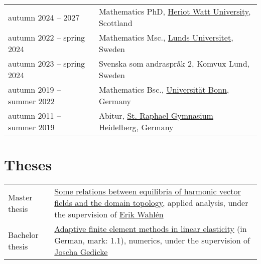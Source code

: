 \documentclass[11pt, letterpaper]{article}
\begin{document}
\begin{tabularx}{\textwidth}{>{\raggedright\arraybackslash}p{45mm} >{\raggedright\arraybackslash}X}
autumn 2024\linebreak\hspace*{1em} -- 2027 & Mathematics PhD, \href{https://www.maxwell.ac.uk/}{Heriot Watt University}, Scottland \\[0.5ex]
  autumn 2022\linebreak\hspace*{1em} -- spring 2024 & Mathematics Msc., \href{https://maths.lu.se/}{Lunds Universitet}, Sweden \\[0.5ex]
  autumn 2023\linebreak\hspace*{1em} -- spring 2024 & Svenska som andraspråk 2, Komvux Lund, Sweden \\[0.5ex]
  autumn 2019\linebreak\hspace*{1em} -- summer 2022 & Mathematics Bsc., \href{http://www.math.uni-bonn.de/}{Universität Bonn}, Germany \\[0.5ex]
  autumn 2011\linebreak\hspace*{1em} -- summer 2019 & Abitur, \href{https://www.srgh.de/}{St. Raphael Gymnasium Heidelberg}, Germany
\end{tabularx}

\section{Theses}
\begin{tabularx}{\textwidth}{p{45mm} >{\raggedright\arraybackslash}X}
  Master thesis & \href{https://raw.githubusercontent.com/TheoKoppenhoefer/master-thesis/main/Text/Thesis_TheoKoppenhoefer.pdf}{Some relations between equilibria of harmonic vector fields and the domain topology},
  applied analysis, under the supervision of \href{https://www.maths.lu.se/english/research/staff/erik-wahlen/}{Erik Wahlén} \\
  Bachelor thesis & \href{https://raw.githubusercontent.com/TheoKoppenhoefer/bachelorarbeit/main/Text/Bachelorarbeit_Hauptteil.pdf}{Adaptive finite element methods in linear elasticity} (in German,  \linebreak mark: 1.1),
  numerics, under the supervision of \href{https://ins.uni-bonn.de/staff/gedicke}{Joscha Gedicke}
\end{tabularx}
\end{document}
